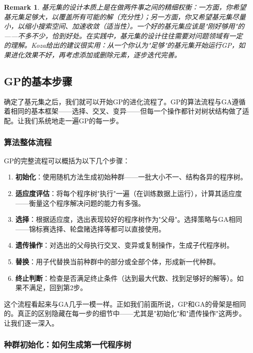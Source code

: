 \documentclass[lang=cn,zihao=-4,a4paper,fontset=windows]{beautybook}
\newtheorem*{remark}{\textbf{Remark}}
\begin{document}
\begin{remark}
基元集的设计本质上是在做两件事之间的精细权衡：一方面，你希望基元集足够大，以覆盖所有可能的解（充分性）；另一方面，你又希望基元集尽量小，以缩小搜索空间、加速收敛（适当性）。一个好的基元集应该是"刚好够用"的——不多不少，恰到好处。在实践中，基元集的设计往往需要对问题领域有一定的理解。Koza给出的建议很实用：从一个你认为"足够"的基元集开始运行GP，如果进化效果不好，再考虑添加或删除元素，逐步迭代完善。
\end{remark}

\subsection{GP的基本步骤}

确定了基元集之后，我们就可以开始GP的进化流程了。GP的算法流程与GA遵循着相同的基本框架——选择、交叉、变异——但每一个操作都针对树状结构做了适配。让我们系统地走一遍GP的每一步。

\subsubsection{算法整体流程}

GP的完整流程可以概括为以下几个步骤：

\begin{enumerate}
    \item \textbf{初始化}：使用随机方法生成初始种群——一批大小不一、结构各异的程序树。
    \item \textbf{适应度评估}：将每个程序树"执行"一遍（在训练数据上运行），计算其适应度——衡量这个程序解决问题的能力有多强。
    \item \textbf{选择}：根据适应度，选出表现较好的程序树作为"父母"。选择策略与GA相同——锦标赛选择、轮盘赌选择等都可以直接使用。
    \item \textbf{遗传操作}：对选出的父母执行交叉、变异或复制操作，生成子代程序树。
    \item \textbf{替换}：用子代替换当前种群中的部分或全部个体，形成新一代种群。
    \item \textbf{终止判断}：检查是否满足终止条件（达到最大代数、找到足够好的解等）。如果不满足，回到第2步。
\end{enumerate}

这个流程看起来与GA几乎一模一样。正如我们前面所说，GP和GA的骨架是相同的。真正的区别隐藏在每一步的细节中——尤其是"初始化"和"遗传操作"这两步。让我们逐一深入。

\subsubsection{种群初始化：如何生成第一代程序树}
\end{document}
